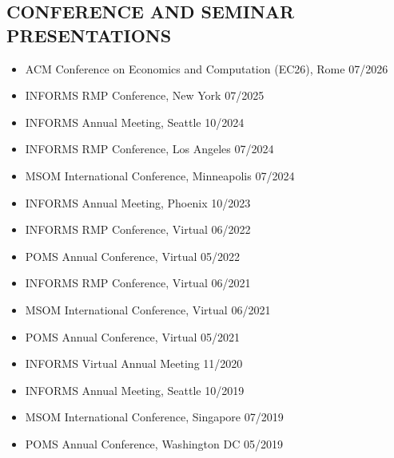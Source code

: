 \documentclass[margin]{res} %
\begin{document}
\begin{resume}
\section{CONFERENCE AND SEMINAR PRESENTATIONS}
\begin{itemize}[leftmargin=*]
    \item ACM Conference on Economics and Computation (EC26), Rome \hfill 07/2026
    \item INFORMS RMP Conference, New York \hfill 07/2025
    \item INFORMS Annual Meeting, Seattle \hfill 10/2024
    \item INFORMS RMP Conference, Los Angeles \hfill 07/2024
    \item MSOM International Conference, Minneapolis \hfill 07/2024
    \item INFORMS Annual Meeting, Phoenix \hfill 10/2023
    \item INFORMS RMP Conference, Virtual \hfill 06/2022
    \item POMS Annual Conference, Virtual \hfill 05/2022
    \item INFORMS RMP Conference, Virtual \hfill 06/2021
    \item MSOM International Conference, Virtual \hfill 06/2021
    \item POMS Annual Conference, Virtual \hfill 05/2021
    \item INFORMS Virtual Annual Meeting \hfill 11/2020
    \item INFORMS Annual Meeting, Seattle \hfill 10/2019
    \item MSOM International Conference, Singapore \hfill 07/2019
    \item POMS Annual Conference, Washington DC \hfill 05/2019
\end{itemize}


\end{resume}
\end{document}
